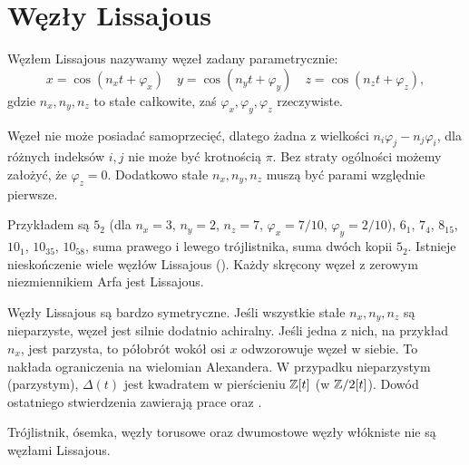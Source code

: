 \section{Węzły Lissajous} %
\label{sec:lissajous}

\begin{definition}
	Węzłem Lissajous nazywamy węzeł zadany parametrycznie:
	\[
		x = \cos(n_xt + \varphi_x) \quad
		y = \cos(n_yt + \varphi_y) \quad
		z = \cos(n_zt + \varphi_z),
	\]
	gdzie $n_x, n_y, n_z$ to stałe całkowite, zaś $\varphi_x, \varphi_y, \varphi_z$ rzeczywiste.
\end{definition}

Węzeł nie może posiadać samoprzecięć, dlatego żadna z wielkości $n_i\varphi_j-n_j\varphi_i$, dla różnych indeksów $i, j$ nie może być krotnością $\pi$.
Bez straty ogólności możemy założyć, że $\varphi_z = 0$.
Dodatkowo stałe $n_x, n_y, n_z$ muszą być parami względnie pierwsze.

Przykładem są $5_2$ (dla $n_x = 3$, $n_y = 2$, $n_z = 7$, $\varphi_x = 7/10$, $\varphi_y = 2/10$), $6_1$, $7_4$, $8_{15}$, $10_1$, $10_{35}$, $10_{58}$, suma prawego i lewego trójlistnika, suma dwóch kopii $5_2$.
Istnieje nieskończenie wiele węzłów Lissajous (\cite{lamm97}).
Każdy skręcony węzeł z zerowym niezmiennikiem Arfa jest Lissajous.

Węzły Lissajous są bardzo symetryczne.
Jeśli wszystkie stałe $n_x, n_y, n_z$ są nieparzyste, węzeł jest silnie dodatnio achiralny.
Jeśli jedna z nich, na przykład $n_x$, jest parzysta, to półobrót wokół osi $x$ odwzorowuje węzeł w siebie.
To nakłada ograniczenia na wielomian Alexandera.
W przypadku nieparzystym (parzystym), $\Delta(t)$ jest kwadratem w pierścieniu $\mathbb Z[t]$ (w $\mathbb Z/2[t]$).
Dowód ostatniego stwierdzenia zawierają prace \cite{hartley79} oraz \cite{murasugi71}.

\begin{corollary}
	Trójlistnik, ósemka, węzły torusowe oraz dwumostowe węzły włókniste nie są węzłami Lissajous.
\end{corollary}

